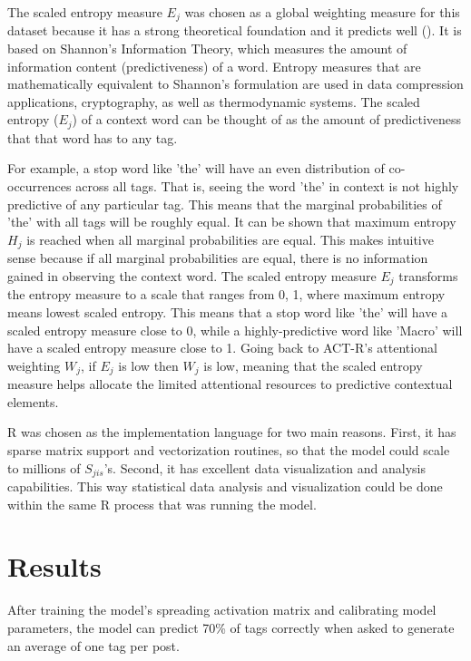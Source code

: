\documentclass[10pt,letterpaper]{article}
\begin{document}
The scaled entropy measure $E_{j}$ was chosen as a global weighting measure for this dataset because it has a strong theoretical foundation and it predicts well ().
It is based on Shannon's Information Theory, which measures the amount of information content (predictiveness) of a word.
Entropy measures that are mathematically equivalent to Shannon's formulation are used in data compression applications, cryptography, as well as thermodynamic systems.
The scaled entropy ($E_{j}$) of a context word can be thought of as the amount of predictiveness that that word has to any tag.

For example, a stop word like 'the' will have an even distribution of co-occurrences across all tags.
That is, seeing the word 'the' in context is not highly predictive of any particular tag.
This means that the marginal probabilities of 'the' with all tags will be roughly equal.
It can be shown that maximum entropy $H_{j}$ is reached when all marginal probabilities are equal.
This makes intuitive sense because if all marginal probabilities are equal, there is no information gained in observing the context word.
The scaled entropy measure $E_{j}$ transforms the entropy measure to a scale that ranges from 0, 1, where maximum entropy means lowest scaled entropy.
This means that a stop word like 'the' will have a scaled entropy measure close to 0, while a highly-predictive word like 'Macro' will have a scaled entropy measure close to 1.
Going back to ACT-R's attentional weighting $W_{j}$, if $E_{j}$ is low then $W_{j}$ is low, meaning that the scaled entropy measure helps allocate the limited attentional resources to predictive contextual elements.


R was chosen as the implementation language for two main reasons.
First, it has sparse matrix support and vectorization routines, so that the model could scale to millions of $S_{jis}$'s.
Second, it has excellent data visualization and analysis capabilities. 
This way statistical data analysis and visualization could be done within the same R process that was running the model. 

\section{Results}

After training the model's spreading activation matrix and calibrating model parameters, the model can predict 70\% of tags correctly when asked to generate an average of one tag per post.
\end{document}
